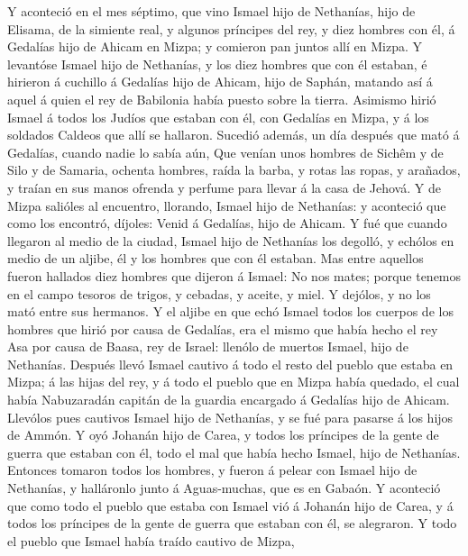  Y aconteció en el mes séptimo, que vino Ismael hijo de
Nethanías, hijo de Elisama, de la simiente real, y algunos príncipes del
rey, y diez hombres con él, á Gedalías hijo de Ahicam en Mizpa; y
comieron pan juntos allí en Mizpa.  Y levantóse Ismael hijo
de Nethanías, y los diez hombres que con él estaban, é hirieron á
cuchillo á Gedalías hijo de Ahicam, hijo de Saphán, matando así á aquel
á quien el rey de Babilonia había puesto sobre la tierra. 
Asimismo hirió Ismael á todos los Judíos que estaban con él, con
Gedalías en Mizpa, y á los soldados Caldeos que allí se hallaron.
 Sucedió además, un día después que mató á Gedalías, cuando
nadie lo sabía aún,  Que venían unos hombres de Sichêm y de
Silo y de Samaria, ochenta hombres, raída la barba, y rotas las ropas, y
arañados, y traían en sus manos ofrenda y perfume para llevar á la casa
de Jehová.  Y de Mizpa salióles al encuentro, llorando,
Ismael hijo de Nethanías: y aconteció que como los encontró, díjoles:
Venid á Gedalías, hijo de Ahicam.  Y fué que cuando llegaron
al medio de la ciudad, Ismael hijo de Nethanías los degolló, y echólos
en medio de un aljibe, él y los hombres que con él estaban. 
Mas entre aquellos fueron hallados diez hombres que dijeron á Ismael: No
nos mates; porque tenemos en el campo tesoros de trigos, y cebadas, y
aceite, y miel. Y dejólos, y no los mató entre sus hermanos.
 Y el aljibe en que echó Ismael todos los cuerpos de los
hombres que hirió por causa de Gedalías, era el mismo que había hecho el
rey Asa por causa de Baasa, rey de Israel: llenólo de muertos Ismael,
hijo de Nethanías.  Después llevó Ismael cautivo á todo el
resto del pueblo que estaba en Mizpa; á las hijas del rey, y á todo el
pueblo que en Mizpa había quedado, el cual había Nabuzaradán capitán de
la guardia encargado á Gedalías hijo de Ahicam. Llevólos pues cautivos
Ismael hijo de Nethanías, y se fué para pasarse á los hijos de Ammón.
 Y oyó Johanán hijo de Carea, y todos los príncipes de la
gente de guerra que estaban con él, todo el mal que había hecho Ismael,
hijo de Nethanías.  Entonces tomaron todos los hombres, y
fueron á pelear con Ismael hijo de Nethanías, y halláronlo junto á
Aguas-muchas, que es en Gabaón.  Y aconteció que como todo
el pueblo que estaba con Ismael vió á Johanán hijo de Carea, y á todos
los príncipes de la gente de guerra que estaban con él, se alegraron.
 Y todo el pueblo que Ismael había traído cautivo de Mizpa,
